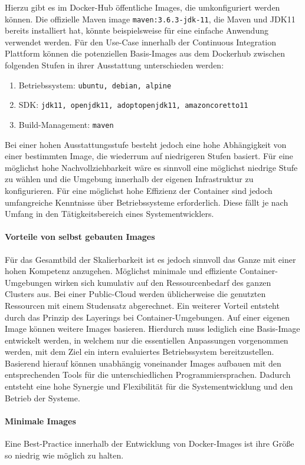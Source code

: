 Hierzu gibt es im Docker-Hub öffentliche Images, die umkonfiguriert werden können. Die offizielle Maven image \lstinline{maven:3.6.3-jdk-11}, die Maven und JDK11 bereits installiert hat, könnte beispielsweise für eine einfache Anwendung verwendet werden. Für den Use-Case innerhalb der Continuous Integration Plattform können die potenziellen Basis-Images aus dem Dockerhub zwischen folgenden Stufen in ihrer Ausstattung unterschieden werden:
\begin{enumerate}
    \item Betriebssystem: \lstinline{ubuntu, debian, alpine}
    \item SDK: \lstinline{jdk11, openjdk11, adoptopenjdk11, amazoncoretto11}
    \item Build-Management: \lstinline{maven}
\end{enumerate}
Bei einer hohen Ausstattungsstufe besteht jedoch eine hohe Abhängigkeit von einer bestimmten Image, die wiederrum auf niedrigeren Stufen basiert. Für eine möglichst hohe Nachvollziehbarkeit wäre es sinnvoll eine möglichst niedrige Stufe zu wählen und die Umgebung innerhalb der eigenen Infrastruktur zu konfigurieren. Für eine möglichst hohe Effizienz der Container sind jedoch umfangreiche Kenntnisse über Betriebssysteme erforderlich. Diese fällt je nach Umfang in den Tätigkeitsbereich eines Systementwicklers.

\paragraph{Vorteile von selbst gebauten Images}
Für das Gesamtbild der Skalierbarkeit ist es jedoch sinnvoll das Ganze mit einer hohen Kompetenz anzugehen. Möglichst minimale und effiziente Container-Umgebungen wirken sich kumulativ auf den Ressourcenbedarf des ganzen Clusters aus. Bei einer Public-Cloud werden üblicherweise die genutzten Ressourcen mit einem Studensatz abgerechnet. Ein weiterer Vorteil entsteht durch das Prinzip des Layerings bei Container-Umgebungen. Auf einer eigenen Image können weitere Images basieren. Hierdurch muss lediglich eine Basis-Image entwickelt werden, in welchem nur die essentiellen Anpassungen vorgenommen werden, mit dem Ziel ein intern evaluiertes Betriebssystem bereitzustellen. Basierend hierauf können unabhängig voneinander Images aufbauen mit den entsprechenden Tools für die unterschiedlichen Programmiersprachen. Dadurch entsteht eine hohe Synergie und Flexibilität für die Systementwicklung und den Betrieb der Systeme.

\paragraph{Minimale Images}
Eine Best-Practice innerhalb der Entwicklung von Docker-Images ist ihre Größe so niedrig wie möglich zu halten. 

